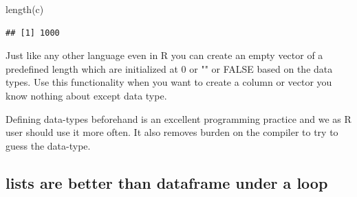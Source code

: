 \documentclass[
]{book}
\newenvironment{Shaded}{\begin{snugshade}}{\end{snugshade}}
\newcommand{\AttributeTok}[1]{\textcolor[rgb]{0.77,0.63,0.00}{#1}}
\newcommand{\CommentTok}[1]{\textcolor[rgb]{0.56,0.35,0.01}{\textit{#1}}}
\newcommand{\ControlFlowTok}[1]{\textcolor[rgb]{0.13,0.29,0.53}{\textbf{#1}}}
\newcommand{\DecValTok}[1]{\textcolor[rgb]{0.00,0.00,0.81}{#1}}
\newcommand{\FloatTok}[1]{\textcolor[rgb]{0.00,0.00,0.81}{#1}}
\newcommand{\FunctionTok}[1]{\textcolor[rgb]{0.00,0.00,0.00}{#1}}
\newcommand{\NormalTok}[1]{#1}
\newcommand{\OtherTok}[1]{\textcolor[rgb]{0.56,0.35,0.01}{#1}}
\newcommand{\SpecialCharTok}[1]{\textcolor[rgb]{0.00,0.00,0.00}{#1}}
\begin{document}
\begin{Shaded}
\begin{Highlighting}[]
\FunctionTok{length}\NormalTok{(c)}
\end{Highlighting}
\end{Shaded}

\begin{verbatim}
## [1] 1000
\end{verbatim}

Just like any other language even in R you can create an empty vector of a predefined length which are initialized at 0 or "" or FALSE based on the data types. Use this functionality when you want to create a column or vector you know nothing about except data type.

Defining data-types beforehand is an excellent programming practice and we as R user should use it more often. It also removes burden on the compiler to try to guess the data-type.

\hypertarget{lists-are-better-than-dataframe-under-a-loop}{%
\subsection{lists are better than dataframe under a loop}\label{lists-are-better-than-dataframe-under-a-loop}}

\begin{Shaded}
\end{Shaded}
\end{document}
